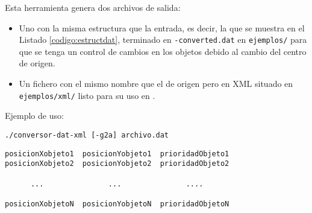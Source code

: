 Esta herramienta genera dos archivos de salida:
\begin{itemize}
\item Uno con la misma estructura que la entrada, es decir, la que se muestra en
el Listado \ref{codigo:estructdat}, terminado en \texttt{-converted.dat} en
\texttt{ejemplos/} para que se tenga un control de cambios en los objetos debido
al cambio del centro de origen.
\item Un fichero con el mismo nombre que el de origen pero en XML situado en
\texttt{ejemplos/xml/} listo para su uso en \CSUO{}.
\end{itemize}

Ejemplo de uso:
\begin{lstlisting}[float=tpb,
                   numbers=none]
./conversor-dat-xml [-g2a] archivo.dat
\end{lstlisting}

\begin{lstlisting}[caption={Estructura de entrada de los ficheros .dat},
                  label={codigo:estructdat}]
posicionXobjeto1  posicionYobjeto1  prioridadObjeto1
posicionXobjeto2  posicionYobjeto2  prioridadObjeto2

      ...               ...               ....

posicionXobjetoN  posicionYobjetoN  prioridadObjetoN
\end{lstlisting}
